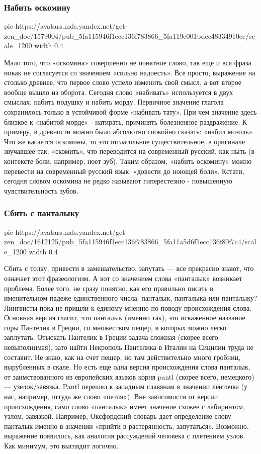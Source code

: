 \subsubsection{Набить оскомину}

\ifcmt
  pic https://avatars.mds.yandex.net/get-zen_doc/1579004/pub_5fa115946f1ecc136f783866_5fa119c001bdcc48334910ee/scale_1200
  width 0.4
\fi

Мало того, что «оскомина» совершенно не понятное слово, так еще и вся фраза
никак не согласуется со значением «сильно надоесть». Все просто, выражение на
столько древнее, что первое слово успело изменить свой смысл, а вот второе
вообще вышло из оборота. Сегодня слово «набивать» используется в двух смыслах:
набить подушку и набить морду. Первичное значение глагола сохранилось только в
устойчивой форме «набивать тату». При чем значение здесь близкое к «набитой
морде» - натирать, причинять болезненное раздражение. К примеру, в древности
можно было абсолютно спокойно сказать: «набил мозоль». Что же касается
оскомины, то это отглагольное существительное, в оригинале звучавшее так:
«скомить», что переводится на современный русский, как ныть (в контексте боли,
например, ноет зуб). Таким образом, «набить оскомину» можно перевести на
современный русский язык: «довести до ноющей боли». Кстати, сегодня словом
оскомина не редко называют гиперестезию - повышенную чувствительность зубов.

\subsubsection{Сбить с панталыку}

\ifcmt
  pic https://avatars.mds.yandex.net/get-zen_doc/1612125/pub_5fa115946f1ecc136f783866_5fa11a5d6f1ecc136f80f7c4/scale_1200
  width 0.4
\fi

Сбить с толку, привести в замешательство, запутать — все прекрасно знают, что
означает этот фразеологизм. А вот со значением слова «панталык» возникает
проблема. Более того, не сразу понятно, как его правильно писать в именительном
падеже единственного числа: панталык, панталыка или панталыку? Лингвисты пока
не пришли к единому мнению по поводу происхождения слова. Основная версия
гласит, что панталык (именно так), это искаженное название горы Пантелик в
Греции, со множеством пещер, в которых можно легко заплутать. Отыскать Пантелик
в Греции задача сложная (скорее всего невыполнимая), зато найти Некрополь
Пантелика в Италии на Сицилии труда не составит. Не знаю, как на счет пещер, но
там действительно много гробниц, вырубленных в скале. Но есть еще одна версия
происхождения слова панталык, от заимствованного из европейских языков корня
pantl (скорее всего, немецкого) — узелок/завязка. Pantl перешел к западным
славянам в значении ленточка (у нас, например, оттуда же слово «петля»). Вне
зависимости от версии происхождения, само слово «панталык» имеет значение
схожее с лабиринтом, узлом, завязкой. Например, Оксфордский словарь дает
определение слову панталык именно в значении «прийти в растерянность,
запутаться». Возможно, выражение появилось, как аналогия рассуждений человека с
плетением узлов. Как минимум, это выглядит логично.


